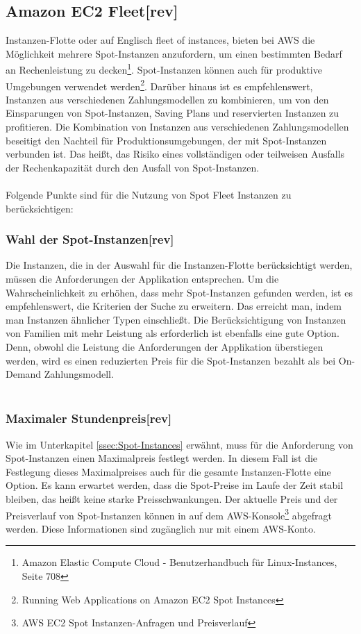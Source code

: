 \subsection{Amazon EC2 Fleet[rev]} \label{sssec:AWS-EC2-Fleet}
Instanzen-Flotte oder auf Englisch fleet of instances, bieten bei AWS die Möglichkeit mehrere Spot-Instanzen anzufordern, um einen bestimmten Bedarf an Rechenleistung zu decken\footnote{\cite{AMZ26} Amazon Elastic Compute Cloud - Benutzerhandbuch für Linux-Instances, Seite 708}. Spot-Instanzen können auch für produktive Umgebungen verwendet werden\footnote{\cite{AMZ24} Running Web Applications on Amazon EC2 Spot Instances}. Darüber hinaus ist es empfehlenswert, Instanzen aus verschiedenen Zahlungsmodellen zu kombinieren, um von den Einsparungen von Spot-Instanzen, Saving Plans und reservierten Instanzen zu profitieren. Die Kombination von Instanzen aus verschiedenen Zahlungsmodellen beseitigt den Nachteil für Produktionsumgebungen, der mit Spot-Instanzen verbunden ist. Das heißt, das Risiko eines vollständigen oder teilweisen Ausfalls der Rechenkapazität durch den Ausfall von Spot-Instanzen.
\\\\
Folgende Punkte sind für die Nutzung von Spot Fleet Instanzen zu berücksichtigen:
\subsubsection*{Wahl der Spot-Instanzen[rev]}
Die Instanzen, die in der Auswahl für die Instanzen-Flotte berücksichtigt werden, müssen die Anforderungen der Applikation entsprechen. Um die Wahrscheinlichkeit zu erhöhen, dass mehr Spot-Instanzen gefunden werden, ist es empfehlenswert, die Kriterien der Suche zu erweitern. Das erreicht man, indem man Instanzen ähnlicher Typen einschließt. Die Berücksichtigung von Instanzen von Familien mit mehr Leistung als erforderlich ist ebenfalls eine gute Option\cite{AMZ24}. Denn, obwohl die Leistung die Anforderungen der Applikation überstiegen werden, wird es einen reduzierten Preis für die Spot-Instanzen bezahlt als bei On-Demand Zahlungsmodell.
\\\\
\subsubsection*{Maximaler Stundenpreis[rev]}
Wie im Unterkapitel \ref{ssec:Spot-Instances} erwähnt, muss für die Anforderung von Spot-Instanzen einen Maximalpreis festlegt werden. In diesem Fall ist die Festlegung dieses Maximalpreises auch für die gesamte Instanzen-Flotte eine Option. Es kann erwartet werden, dass die Spot-Preise im Laufe der Zeit stabil bleiben, das heißt keine starke Preisschwankungen. Der aktuelle Preis und der Preisverlauf von Spot-Instanzen können in auf dem AWS-Konsole\footnote{\cite{AMZ25} AWS EC2 Spot Instanzen-Anfragen und Preisverlauf} abgefragt werden. Diese Informationen sind zugänglich nur mit einem AWS-Konto.
\\
